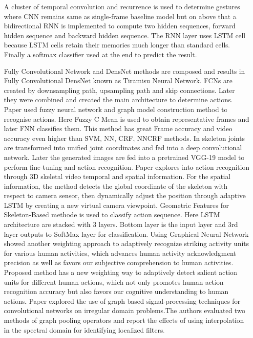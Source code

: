 \documentclass[11pt,english]{article}
\begin{document}
 A cluster of temporal convolution and recurrence \citep{pigou2018beyond} is used to determine gestures where CNN remains same as single-frame baseline model but on above that a bidirectional RNN is implemented to compute two hidden sequences, forward hidden sequence and backward hidden sequence. The RNN layer uses LSTM cell because LSTM cells retain their memories much longer than standard cells. Finally a softmax classifier used at the end to predict the result.
 

 
Fully Convolutional Network and DensNet methods are composed and results in Fully Convolutional DensNet\citep{jegou2017one} known as Tiramisu Neural Network. FCNs are created by downsampling path, upsampling path and skip connections. Later they were combined and created the main architecture to determine actions. Paper\citep{xiao2017action} used fuzzy neural network and graph model construction method to recognise actions. Here Fuzzy C Mean is used to obtain representative frames and later FNN classifies them. This method has great Frame accuracy and video accuracy even higher than SVM, NN, CRF, NNCRF methods. 
In \citep{li2017end} skeleton joints are transformed into unified joint coordinates and fed into a deep convolutional network. Later the generated images are fed into a pretrained VGG-19  model to perform fine-tuning and action recognition. Paper \citep{zhang2017view} explores into action recognition through 3D skeletal video temporal and spatial information. For the spatial information, the method detects the global coordinate of the skeleton with respect to camera sensor, then dynamically adjust the position through adaptive LSTM by creating a new virtual camera viewpoint. Geometric Features for Skeleton-Based methode \citep{zhang2017geometric} is used to classify action sequence. Here LSTM architecture are stacked with 3 layers. Bottom layer is the input layer and 3rd layer outputs to SoftMax layer for classification. 
Using Graphical Neural Network \citep{li2018action} showed another weighting approach to adaptively recognize striking activity units for various human activities, which advances human activity acknowledgment precision as well as favors our subjective comprehension to human activities. 
Proposed method has a new weighting way to adaptively detect salient action units for different human actions, which not only promotes human action recognition accuracy but also favors our cognitive understanding to human actions. Paper \citep{edwards2016graph} explored the use of graph based signal-processing techniques for convolutional networks on irregular domain problems.The authors evaluated two methods of graph pooling operators and report the effects of using interpolation in the spectral domain for identifying localized filters. 
\end{document}
